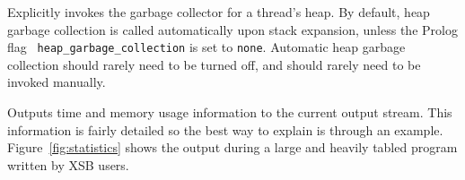 \begin{description}
%
Explicitly invokes the garbage collector for a thread's heap. By
default, heap garbage collection is called automatically
upon stack expansion, unless the Prolog flag {\tt
  heap\_garbage\_collection} is set to {\tt none}.  Automatic heap
garbage collection should rarely need to be turned off, and should
rarely need to be invoked manually.

\comment{
}

%
Outputs time and memory usage information to the current output
stream.  This information is fairly detailed so the best way to
explain is through an example.  Figure~\ref{fig:statistics} shows the
output during a large and heavily tabled program written by XSB users.



\end{description}

